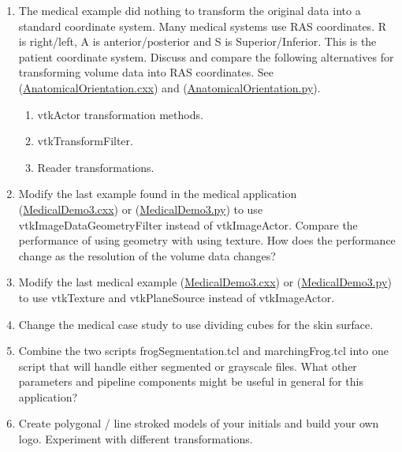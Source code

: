 \begin{enumerate}

	\item The medical example did nothing to transform the original data into a standard coordinate system. Many medical systems use RAS coordinates. R is right/left, A is anterior/posterior and S is Superior/Inferior. This is the patient coordinate system. Discuss and compare the following alternatives for transforming volume data into RAS coordinates. See (\href{https://lorensen.github.io/VTKExamples/site/Cxx/VisualizationAlgorithms/AnatomicalOrientation/}{AnatomicalOrientation.cxx}) and (\href{https://lorensen.github.io/VTKExamples/site/Python/VisualizationAlgorithms/AnatomicalOrientation/}{AnatomicalOrientation.py}).
	\begin{enumerate}
		\item vtkActor transformation methods.
		\item vtkTransformFilter.
		\item Reader transformations.
	\end{enumerate}

	\item Modify the last example found in the medical application (\href{https://lorensen.github.io/VTKExamples/site/Cxx/Medical/MedicalDemo3/}{MedicalDemo3.cxx}) or (\href{https://lorensen.github.io/VTKExamples/site/Python/Medical/MedicalDemo3/}{MedicalDemo3.py}) to use vtkImageDataGeometryFilter instead of
	vtkImageActor. Compare the performance of using geometry with using
	texture. How does the performance change as the resolution of the
	volume data changes?

	\item Modify the last medical example (\href{https://lorensen.github.io/VTKExamples/site/Cxx/Medical/MedicalDemo3/}{MedicalDemo3.cxx}) or (\href{https://lorensen.github.io/VTKExamples/site/Python/Medical/MedicalDemo3/}{MedicalDemo3.py}) to use vtkTexture and vtkPlaneSource instead of vtkImageActor.

	\item Change the medical case study to use dividing cubes for the skin surface.

	\item Combine the two scripts frogSegmentation.tcl and marchingFrog.tcl into one script that will handle either segmented or grayscale files. What other parameters and pipeline components might be useful in general for this application?

	\item Create polygonal / line stroked models of your initials and build your own logo. Experiment with different transformations.


\end{enumerate}
